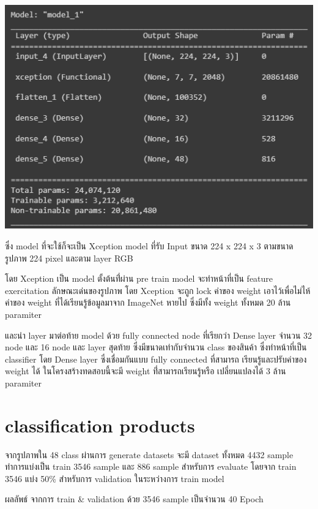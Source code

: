 \begin{center}
  \includegraphics[scale=0.45]{pic/model.png}
\end{center}
  
ซึ่ง model ที่จะใช้ก็จะเป็น Xception model ที่รับ Input ขนาด 224 x 224 x 3 ตามขนาดรูปภาพ 224 pixel และตาม layer RGB

โดย Xception เป็น model ตั้งต้นที่่ผ่าน pre train model จะทำหน้าที่เป็น feature exercitation ลักษณะเด่นของรูปภาพ
โดย Xception จะถูก lock ค่าของ weight เอาไว้เพื่อไม่ไห้ค่าของ weight ที่ได้เรียนรู้ข้อมูลมาจาก ImageNet หายไป  ซึ่งมีทั้ง weight ทั้งหมด 20 ล้าน paramiter

 และนำ layer มาต่อท้าย model ด้วย fully connected node ที่เรียกว่า Dense layer จำนวน 32 node และ 16 node และ 
layer สุดท้าย ซึ่งมีขนาดเท่ากับจำนวน class ของสินค้า ซึ่งทำหน้าที่เป็น classifier
โดย Dense layer ซึ่งเชื่อมกันแบบ fully connected ที่สามารถ เรียนรู้และปรับค่าของ weight ได้
ในโครงสร้างทดสอบนี้จะมี weight ที่่สามารถเรียนรู้หรือ เปลี่ยนแปลงได้ 3 ล้าน paramiter
   

\section{classification products}
จากรูปภาพใน 48 class ผ่านการ generate datasets จะมี dataset ทั้งหมด 4432 sample
 ทำการแบ่งเป็น train 3546 sample และ  886 sample สำหรับการ evaluate 
โดยจาก train 3546 แบ่ง 50\% สำหรับการ validation ในระหว่างการ train model

\par ผลลัพธ์ จากการ train \& validation ด้วย 3546 sample เป็นจำนวน 40 Epoch

